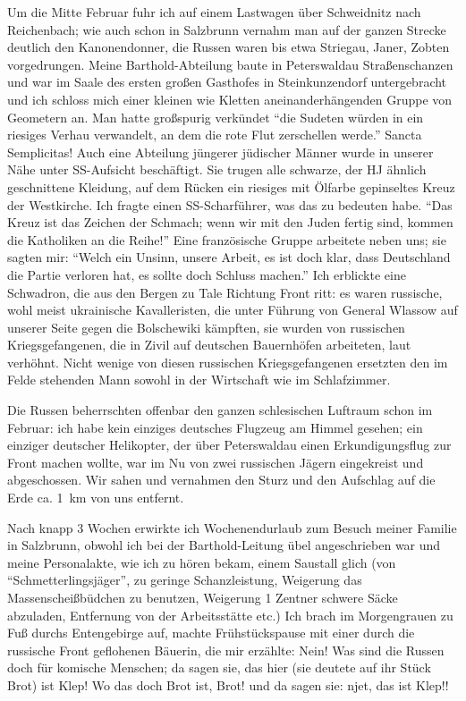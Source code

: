 \documentclass[a5paper,pagesize,10pt,twoside=true]{scrbook}
\renewcommand{\marginpar}[2][]{}
\begin{document}
Um die Mitte Februar fuhr ich auf einem Lastwagen über Schweidnitz nach Reichenbach; wie auch schon in Salzbrunn vernahm man auf der ganzen Strecke deutlich den Kanonendonner, die Russen waren bis etwa Striegau, Janer, Zobten vorgedrungen. Meine Barthold-Abteilung baute in Peterswaldau Straßenschanzen und war im Saale des ersten \marginpar{60} großen Gasthofes in Steinkunzendorf untergebracht und ich schloss mich einer kleinen wie Kletten aneinanderhängenden Gruppe von Geometern an. Man hatte großspurig verkündet \enquote{die Sudeten würden in ein riesiges Verhau verwandelt, an dem die rote Flut zerschellen werde.} Sancta Semplicitas! Auch eine Abteilung jüngerer jüdischer Männer wurde in unserer Nähe unter SS-Aufsicht beschäftigt. Sie trugen alle schwarze, der HJ ähnlich geschnittene Kleidung, auf dem Rücken ein riesiges mit Ölfarbe gepinseltes Kreuz der Westkirche. Ich fragte einen SS-Scharführer, was das zu bedeuten habe. \enquote{Das Kreuz ist das Zeichen der Schmach; wenn wir mit den Juden fertig sind, kommen die Katholiken an die Reihe!} Eine französische Gruppe arbeitete neben uns; sie sagten mir: \enquote{Welch ein Unsinn, unsere Arbeit, es ist doch klar, dass Deutschland die Partie verloren hat, es sollte doch Schluss machen.} Ich erblickte eine Schwadron, die aus den Bergen zu Tale Richtung Front ritt: es waren russische, wohl meist ukrainische Kavalleristen, die unter Führung von General Wlassow auf unserer Seite gegen die Bolschewiki kämpften, sie wurden von russischen Kriegsgefangenen, die in Zivil auf \marginpar{61} deutschen Bauernhöfen arbeiteten, laut verhöhnt. Nicht wenige von diesen russischen Kriegsgefangenen ersetzten den im Felde stehenden Mann sowohl in der Wirtschaft wie im Schlafzimmer.

Die Russen beherrschten offenbar den ganzen schlesischen Luftraum schon im Februar: ich habe kein einziges deutsches Flugzeug am Himmel gesehen; ein einziger deutscher Helikopter, der über Peterswaldau einen Erkundigungsflug zur Front machen wollte, war im Nu von zwei russischen Jägern eingekreist und abgeschossen. Wir sahen und vernahmen den Sturz und den Aufschlag auf die Erde ca. 1~km von uns entfernt.

Nach knapp 3 Wochen erwirkte ich Wochenendurlaub zum Besuch meiner Familie in Salzbrunn, obwohl ich bei der Barthold-Leitung übel angeschrieben war und meine Personalakte, wie ich zu hören bekam, einem Saustall glich (von \enquote{Schmetterlingsjäger}, zu geringe Schanzleistung, Weigerung das Massenscheißbüdchen zu benutzen, Weigerung 1 Zentner schwere Säcke abzuladen, Entfernung von der Arbeitsstätte etc.)
Ich brach im Morgengrauen zu Fuß durchs Entengebirge auf, machte Frühstückspause mit einer durch die russische Front geflohenen Bäuerin, die mir erzählte: Nein! Was sind die Russen doch für komische Menschen; da sagen sie, das hier (sie deutete auf ihr Stück Brot) ist Klep! Wo \marginpar{62} das doch Brot ist, Brot! und da sagen sie: njet, das ist Klep!!
\end{document}
